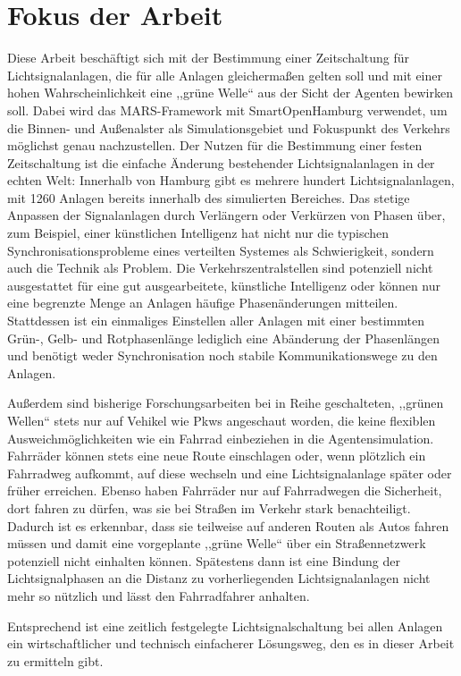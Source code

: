 %
%


\section{Fokus der Arbeit}\label{sec:focus-of-thesis}

Diese Arbeit beschäftigt sich mit der Bestimmung einer Zeitschaltung für Lichtsignalanlagen, die für alle Anlagen gleichermaßen gelten soll und mit einer hohen Wahrscheinlichkeit eine ,,grüne Welle`` aus der Sicht der Agenten bewirken soll.
Dabei wird das MARS-Framework mit SmartOpenHamburg verwendet, um die Binnen- und Außenalster als Simulationsgebiet und Fokuspunkt des Verkehrs möglichst genau nachzustellen.
Der Nutzen für die Bestimmung einer festen Zeitschaltung ist die einfache Änderung bestehender Lichtsignalanlagen in der echten Welt: Innerhalb von Hamburg gibt es mehrere hundert Lichtsignalanlagen, mit 1260 Anlagen bereits innerhalb des simulierten Bereiches.
Das stetige Anpassen der Signalanlagen durch Verlängern oder Verkürzen von Phasen über, zum Beispiel, einer künstlichen Intelligenz hat nicht nur die typischen Synchronisationsprobleme eines verteilten Systemes als Schwierigkeit, sondern auch die Technik als Problem.
Die Verkehrszentralstellen sind potenziell nicht ausgestattet für eine gut ausgearbeitete, künstliche Intelligenz oder können nur eine begrenzte Menge an Anlagen häufige Phasenänderungen mitteilen.
Stattdessen ist ein einmaliges Einstellen aller Anlagen mit einer bestimmten Grün-, Gelb- und Rotphasenlänge lediglich eine Abänderung der Phasenlängen und benötigt weder Synchronisation noch stabile Kommunikationswege zu den Anlagen.

Außerdem sind bisherige Forschungsarbeiten bei in Reihe geschalteten, ,,grünen Wellen`` stets nur auf Vehikel wie Pkws angeschaut worden, die keine flexiblen Ausweichmöglichkeiten wie ein Fahrrad einbeziehen in die Agentensimulation.
Fahrräder können stets eine neue Route einschlagen oder, wenn plötzlich ein Fahrradweg aufkommt, auf diese wechseln und eine Lichtsignalanlage später oder früher erreichen.
Ebenso haben Fahrräder nur auf Fahrradwegen die Sicherheit, dort fahren zu dürfen, was sie bei Straßen im Verkehr stark benachteiligt.
Dadurch ist es erkennbar, dass sie teilweise auf anderen Routen als Autos fahren müssen und damit eine vorgeplante ,,grüne Welle`` über ein Straßennetzwerk potenziell nicht einhalten können.
Spätestens dann ist eine Bindung der Lichtsignalphasen an die Distanz zu vorherliegenden Lichtsignalanlagen nicht mehr so nützlich und lässt den Fahrradfahrer anhalten.

Entsprechend ist eine zeitlich festgelegte Lichtsignalschaltung bei allen Anlagen ein wirtschaftlicher und technisch einfacherer Lösungsweg, den es in dieser Arbeit zu ermitteln gibt.
